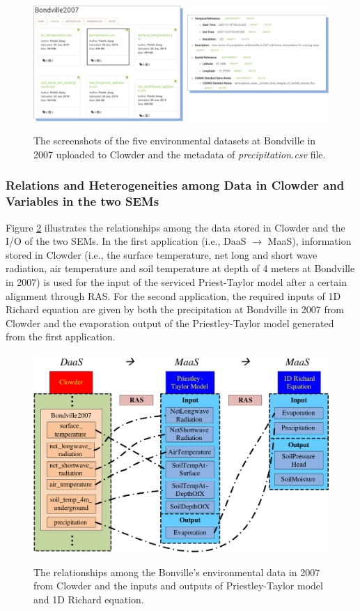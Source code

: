 \documentclass[review]{elsarticle}
\begin{document}
\begin{landscape}
\begin{figure}[!htbp]
\centering
\includegraphics[scale=0.4]{../figures/figure_6}
\label{figure6}
\caption{The screenshots of the five environmental datasets at Bondville in 2007 uploaded to Clowder and the metadata of \textit{precipitation.csv} file.}
\end{figure}
\end{landscape}

\subsubsection{Relations and Heterogeneities among Data in Clowder and Variables in the two SEMs} Figure \ref{figure7} illustrates the relationships among the data stored in Clowder and the I/O of the two SEMs. In the first application (i.e., DaaS $\rightarrow$ MaaS), information stored in Clowder (i.e., the surface temperature, net long and short wave radiation, air temperature and soil temperature at depth of 4 meters at Bondville in 2007) is used for the input of the serviced Priest-Taylor model after a certain alignment through RAS. For the second application, the required inputs of 1D Richard equation are given by both the precipitation at Bondville in 2007 from Clowder and the evaporation output of the Priestley-Taylor model generated from the first application. 

\begin{figure}[!htbp]
\centering
\includegraphics[scale=0.4]{../figures/figure_7}
\label{figure7}
\caption{The relationships among the Bonville’s environmental data in 2007 from Clowder and the inputs and outputs of Priestley-Taylor model and 1D Richard equation.}
\end{figure}
\end{document}
